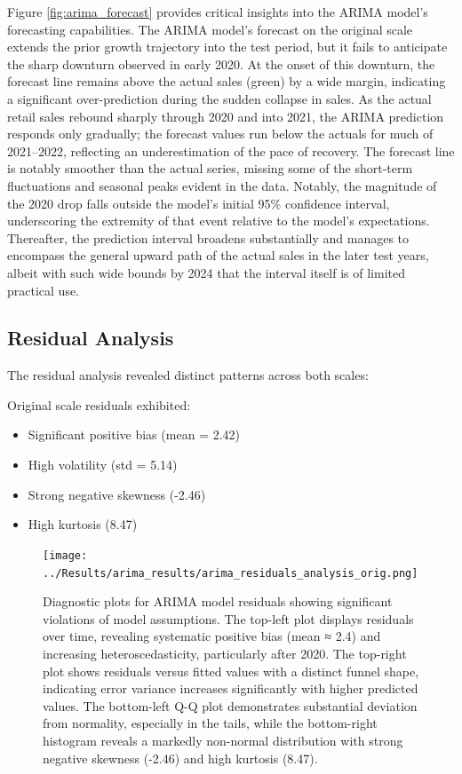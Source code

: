 \documentclass[12pt,a4paper]{report}
\begin{document}
Figure \ref{fig:arima_forecast} provides critical insights into the ARIMA model's forecasting capabilities. The ARIMA model's forecast on the original scale extends the prior growth trajectory into the test period, but it fails to anticipate the sharp downturn observed in early 2020. At the onset of this downturn, the forecast line remains above the actual sales (green) by a wide margin, indicating a significant over-prediction during the sudden collapse in sales. As the actual retail sales rebound sharply through 2020 and into 2021, the ARIMA prediction responds only gradually; the forecast values run below the actuals for much of 2021–2022, reflecting an underestimation of the pace of recovery. The forecast line is notably smoother than the actual series, missing some of the short-term fluctuations and seasonal peaks evident in the data. Notably, the magnitude of the 2020 drop falls outside the model's initial 95\% confidence interval, underscoring the extremity of that event relative to the model's expectations. Thereafter, the prediction interval broadens substantially and manages to encompass the general upward path of the actual sales in the later test years, albeit with such wide bounds by 2024 that the interval itself is of limited practical use.

\subsection{Residual Analysis}
The residual analysis revealed distinct patterns across both scales:

Original scale residuals exhibited:
\begin{itemize}
    \item Significant positive bias (mean = 2.42)
    \item High volatility (std = 5.14)
    \item Strong negative skewness (-2.46)
    \item High kurtosis (8.47)
\end{itemize}

\begin{figure}[htbp]
\centering
\texttt{[image: ../Results/arima\_results/arima\_residuals\_analysis\_orig.png]}
\caption{Diagnostic plots for ARIMA model residuals showing significant violations of model assumptions. The top-left plot displays residuals over time, revealing systematic positive bias (mean ≈ 2.4) and increasing heteroscedasticity, particularly after 2020. The top-right plot shows residuals versus fitted values with a distinct funnel shape, indicating error variance increases significantly with higher predicted values. The bottom-left Q-Q plot demonstrates substantial deviation from normality, especially in the tails, while the bottom-right histogram reveals a markedly non-normal distribution with strong negative skewness (-2.46) and high kurtosis (8.47).}
\label{fig:arima_residuals}
\end{figure}
\end{document}
